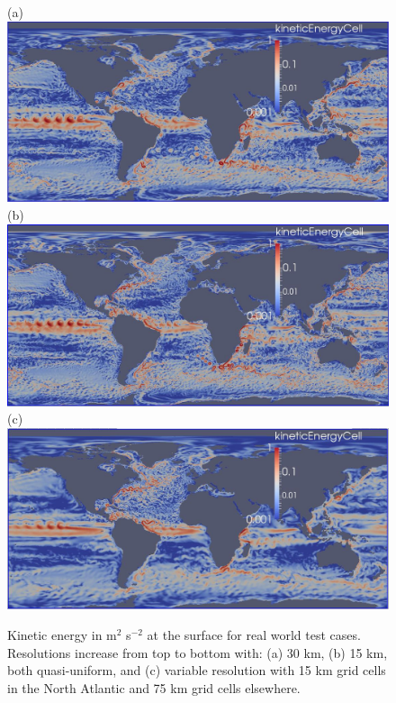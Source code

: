 \begin{figure}[H]
	\centering
(a)\includegraphics[scale=0.36]{ocean/figures/m72s_30km_yr11_k1_ke.jpg}\\
(b)\includegraphics[scale=0.36]{ocean/figures/m72r_15km_yr2_k1_ke.jpg}\\
(c)\includegraphics[scale=0.36]{ocean/figures/m72t_NA_15km_yr11_k1_ke.jpg}
\caption{Kinetic energy in m$^2$ s$^{-2}$ at the surface for real world test cases.  Resolutions increase from top to bottom with: (a) 30 km, (b) 15 km, both quasi-uniform, and (c) variable resolution with 15 km grid cells in the North Atlantic and 75 km grid cells elsewhere. }
	\label{fig:real_world_ke2}
\end{figure}

